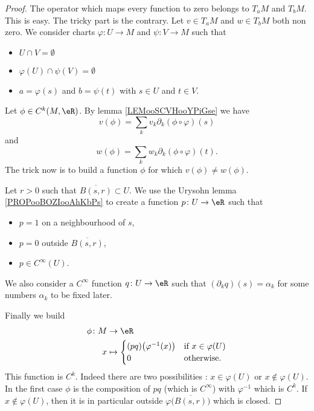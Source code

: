 \begin{proof}
	The operator which maps every function to zero belongs to \( T_aM\) and \( T_bM\). This is easy. The tricky part is the contrary. Let \( v\in T_aM\) and \( w\in T_bM\) both non zero. We consider charts \( \varphi\colon U\to M\) and \( \psi\colon V\to M\) such that
	\begin{itemize}
		\item \( U\cap V=\emptyset\)
		\item \( \varphi(U)\cap \psi(V)=\emptyset\)
		\item \( a=\varphi(s)\) and \( b=\psi(t)\) with \( s\in U\) and \( t\in V\).
	\end{itemize}
	Let \( \phi\in C^k(M,\eR)\). By lemma \ref{LEMooSCVHooYPiGse} we have
	\begin{equation}        \label{EQooTQKZooIeQNaU}
		v(\phi)=\sum_kv_k\partial_k(\phi\circ \varphi)(s)
	\end{equation}
	and
	\begin{equation}
		w(\phi)=\sum_kw_k\partial_k(\phi\circ \varphi)(t).
	\end{equation}
	The trick now is to build a function \( \phi\) for which \( v(\phi)\neq w(\phi)\).

	Let \( r>0\) such that \( \overline{ B(s,r) }\subset U\). We use the Urysohn lemma \ref{PROPooBOZIooAhKbPs} to create a function \( p\colon U\to \eR\) such that
	\begin{itemize}
		\item \( p=1\) on a neighbourhood of \( s\),
		\item \( p=0\) outside \( \overline{ B(s,r) }\),
		\item \( p\in  C^{\infty}(U)\).
	\end{itemize}
	We also consider a \(  C^{\infty}\) function \( q\colon U\to \eR\) such that \( (\partial_kq)(s)=\alpha_k\) for some numbers \( \alpha_k\) to be fixed later.

	Finally we build
	\begin{equation}
		\begin{aligned}
			\phi\colon M & \to \eR                                                                       \\
			x            & \mapsto \begin{cases}
				                       (pq)\big( \varphi^{-1}(x) \big) & \text{if }  x\in \varphi(U) \\
				                       0                               & \text{otherwise. }
			                       \end{cases}
		\end{aligned}
	\end{equation}
	This function is \( C^k\). Indeed there are two possibilities : \( x\in \varphi(U)\) or \( x\notin\varphi(U)\). In the first case \( \phi\) is the composition of \( pq\) (which is \(  C^{\infty}\)) with \( \varphi^{-1}\) which is \( C^k\). If \( x\notin\varphi(U)\), then it is in particular outside \( \varphi\big( \overline{ B(s,r) } \big)\) which is closed.


\end{proof}
